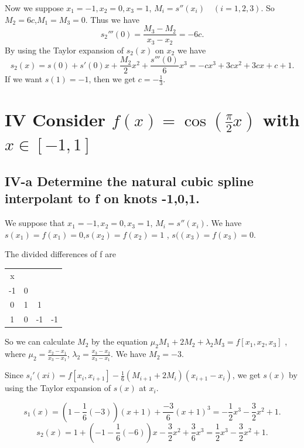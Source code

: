 \documentclass[twoside,a4paper]{article}
\begin{document}
Now we suppose $x_1=-1,x_2=0,x_3=1$, $M_i=s''\left( x_i \right) \quad \left( i=1,2,3 \right) $.
So $M_2=6c$,$M_1=M_3=0$. Thus we have
\[
	s_2'''\left( 0 \right)=\frac{M_3-M_2}{x_3-x_2}=-6c 
.\] 
By using the Taylor expansion of $s_2\left( x \right) $ on $x_2$ we have
\[
	s_2\left( x \right)=s\left( 0 \right)+s'\left( 0 \right)x+\frac{M_2}{2}x^2+\frac{s'''\left( 0 \right) }{6}x^{3}
	=-cx^{3}+3cx^2+3cx+c+1
.\]
If we want $s\left( 1 \right)=-1 $, then we get $c=-\frac{1}{3}$. 

\section*{IV \small{Consider $f\left( x \right)=\cos\left( \frac{\pi}{2}x \right)$ with $x\in[-1,1]$}}

\subsection*{IV-a \small{Determine the natural cubic spline interpolant to f on knots -1,0,1.}}

We suppose that $x_1=-1,x_2=0,x_3=1$, $M_i=s''\left( x_i \right)$.
We have $s\left( x_1 \right)=f\left( x_1 \right)=0$,$s\left( x_2 \right)=f\left( x_2 \right)=1  $ 
, $s(\left( x_3 \right)=f\left( x_3 \right)=0 $.

The divided differences of f are

\begin{tabular}{c|ccc}
x\\
-1 &0\\
0  &1  &1\\
1  &0  &-1  &-1\\
\end{tabular}

So we can calculate $M_2$ by the equation $\mu_2 M_1+2M_2+\lambda_2M_3=f[x_1,x_2,x_3]$
, where $\mu_2=\frac{x_2-x_1}{x_3-x_1}$, $\lambda_2=\frac{x_3-x_2}{x_3-x_1}$.
We have $M_2=-3$. 

Since $s_i'\left( xi \right)=f[x_i,x_{i+1}]-\frac{1}{6}\left( M_{i+1}+2M_i\right)\left( x_{i+1}-x_i \right)  $,
we get $s\left( x \right) $ by using the Taylor expansion of $s\left( x \right) $ at $x_i$.

 \[
	 s_1\left( x \right)=\left( 1-\frac{1}{6}\left( -3 \right)  \right)\left( x+1 \right)+\frac{-3}{6}\left( x+1 \right)^{3}  
	 =-\frac{1}{2}x^{3}-\frac{3}{2}x^2+1
 .\] 
 \[
	 s_2\left( x \right)=1+\left( -1-\frac{1}{6}\left( -6 \right)  \right)x-\frac{3}{2}x^2+\frac{3}{6}x^{3}
	 =\frac{1}{2}x^{3}-\frac{3}{2}x^2+1
 .\] 
\end{document}
